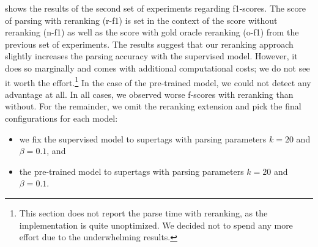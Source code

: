 \documentclass[../../document.tex]{subfiles}
\begin{document}
     shows the results of the second set of experiments regarding f1-scores.
    The score of parsing with reranking (r-f1) is set in the context of the score without reranking (n-f1) as well as the score with gold oracle reranking (o-f1) from the previous set of experiments.
    The results suggest that our reranking approach slightly increases the parsing accuracy with the supervised model.
    However, it does so marginally and comes with additional computational costs; we do not see it worth the effort.\footnote{
        This section does not report the parse time with reranking, as the implementation is quite unoptimized.
        We decided not to spend any more effort due to the underwhelming results.
    }
    In the case of the pre-trained model, we could not detect any advantage at all. In all cases, we observed worse f-scores with reranking than without.
    For the remainder, we omit the reranking extension and pick the final configurations for each model:
    \begin{itemize}
        \item we fix the supervised model to  supertags with parsing parameters \(k=20\) and \(\beta=0.1\), and
        \item the pre-trained model to  supertags with parsing parameters \(k=20\) and \(\beta=0.1\).
    \end{itemize}
\end{document}
